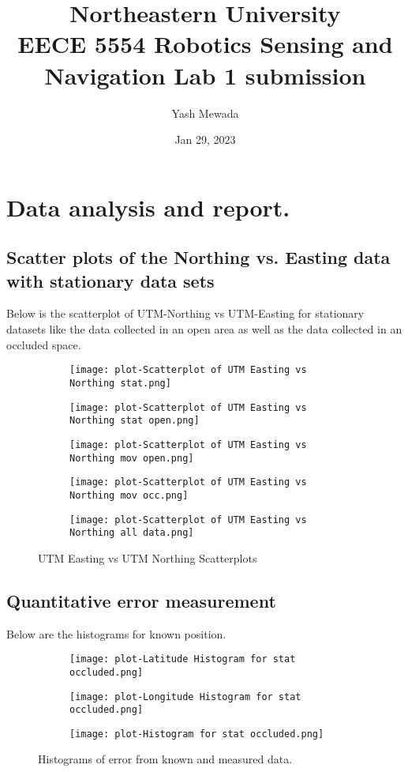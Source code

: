 \documentclass[a4paper]{article}
\title{Northeastern University\\EECE 5554 Robotics Sensing and Navigation Lab 1 submission}
\author{Yash Mewada}
\date{Jan 29, 2023}
\begin{document}
\maketitle
\section{Data analysis and report.}
\subsection{Scatter plots of the Northing vs. Easting data with stationary data sets}
Below is the scatterplot of UTM-Northing vs UTM-Easting for stationary datasets like the data collected in an open area as well as the data collected in an occluded space.
\begin{figure}[H]
\begin{subfigure}{}
     \texttt{[image: plot-Scatterplot of UTM Easting vs Northing stat.png]}
\end{subfigure}
\begin{subfigure}{}
    \texttt{[image: plot-Scatterplot of UTM Easting vs Northing stat open.png]}
\end{subfigure}
\begin{subfigure}{}
    \texttt{[image: plot-Scatterplot of UTM Easting vs Northing mov open.png]}
\end{subfigure}
\begin{subfigure}{}
    \texttt{[image: plot-Scatterplot of UTM Easting vs Northing mov occ.png]}
\end{subfigure}
\begin{subfigure}{}
    \texttt{[image: plot-Scatterplot of UTM Easting vs Northing all data.png]}
\end{subfigure}
\caption{UTM Easting vs UTM Northing Scatterplots}
\end{figure}
\subsection{Quantitative error measurement}
Below are the histograms for known position.
\begin{figure}[H]
\begin{subfigure}{}
     \texttt{[image: plot-Latitude Histogram for stat occluded.png]}
\end{subfigure}
\begin{subfigure}{}
    \texttt{[image: plot-Longitude Histogram for stat occluded.png]}
\end{subfigure}
\begin{subfigure}{}
    \texttt{[image: plot-Histogram for stat occluded.png]}
\end{subfigure}
\caption{Histograms of error from known and measured data.}
\end{figure}
\end{document}
